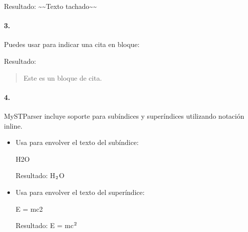 \documentclass[a4paper,10pt,spanish]{sphinxmanual}
\begin{document}
\begin{sphinxVerbatim}[commandchars=\\\{\}]
\end{sphinxVerbatim}

\sphinxAtStartPar
Resultado: \textasciitilde{}\textasciitilde{}Texto tachado\textasciitilde{}\textasciitilde{}


\paragraph{3. }
\label{\detokenize{configuracion_inicial/013.guia_de_myst_parser:citas-tipograficas}}
\sphinxAtStartPar
Puedes usar \sphinxcode{\sphinxupquote{\textgreater{}}} para indicar una cita en bloque:

\begin{sphinxVerbatim}[commandchars=\\\{\}]
\end{sphinxVerbatim}

\sphinxAtStartPar
Resultado:
\begin{quote}

\sphinxAtStartPar
Este es un bloque de cita.
\end{quote}


\paragraph{4. }
\label{\detokenize{configuracion_inicial/013.guia_de_myst_parser:subindice-y-superindice}}
\sphinxAtStartPar
MyST\sphinxhyphen{}Parser incluye soporte para subíndices y superíndices utilizando notación inline.
\begin{itemize}
\item {} 
\sphinxAtStartPar
{} Usa \sphinxcode{\sphinxupquote{\textasciitilde{}}} para envolver el texto del subíndice:

\begin{sphinxVerbatim}[commandchars=\\\{\}]
H\PYGZti{}2\PYGZti{}O
\end{sphinxVerbatim}

\sphinxAtStartPar
Resultado: H\(\sb{\text{2}}\)O

\item {} 
\sphinxAtStartPar
{} Usa \sphinxcode{\sphinxupquote{\textasciicircum{}}} para envolver el texto del superíndice:

\begin{sphinxVerbatim}[commandchars=\\\{\}]
E = mc\PYGZca{}2\PYGZca{}
\end{sphinxVerbatim}

\sphinxAtStartPar
Resultado: E = mc\(\sp{\text{2}}\)

\end{itemize}
\end{document}
